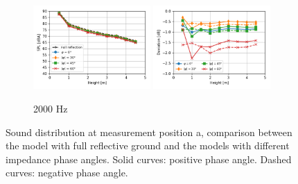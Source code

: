 \begin{figure}[H]\ContinuedFloat
	\begin{subfigure}[b]{\textwidth}
		\centering
		\includegraphics[width=0.49\textwidth]{fig/chap5/impedance/third_octave/SPL_2000_Hz.png}
		\includegraphics[width=0.49\textwidth]{fig/chap5/impedance/third_octave/deviation_2000_Hz.png}
		\caption{2000 Hz}
	\end{subfigure}

	\caption{Sound distribution at measurement position a, comparison between the model with full reflective ground and the models with different impedance phase angles. Solid curves: positive phase angle. Dashed curves: negative phase angle.}
	\label{fig:third_octave_over_height_impedance}
\end{figure}

